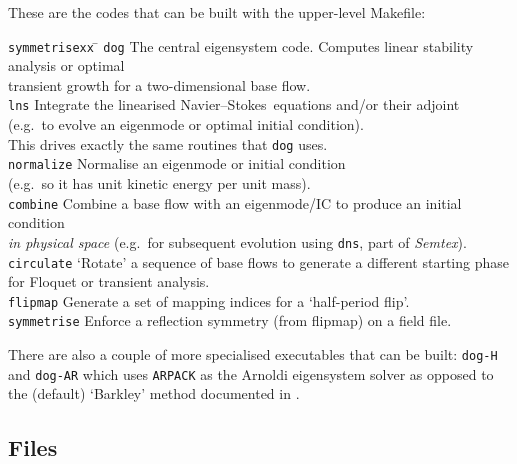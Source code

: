 \documentclass[11pt,a4paper]{report}
\newcommand\NavSto{Navier--Stokes}
\newcommand{\eg}{e.g.\ }
\newcommand{\Semtex}{\emph{Semtex}}
\begin{document}
These are the codes that can be built with the upper-level Makefile:
\begin{tabbing}
\texttt{symmetrisexx} \= \kill
% 
\texttt{dog} 
\> The central eigensystem code. Computes linear stability analysis or 
optimal \\
\> transient growth for a two-dimensional base flow.\\
%
\texttt{lns} 
\> Integrate the linearised \NavSto\ equations and/or their adjoint\\ 
\> (\eg to evolve an eigenmode or optimal initial condition).\\ 
\> This drives exactly the same routines that \texttt{dog} uses.\\
%
\texttt{normalize} 
\> Normalise an eigenmode or initial condition \\
\> (\eg so it has unit kinetic energy per unit mass).\\
%
\texttt{combine} 
\> Combine a base flow with an eigenmode/IC to
produce an initial condition \\ \> \emph{in physical space} (\eg for
subsequent evolution using \texttt{dns}, part of \Semtex).\\
%
\texttt{circulate} 
\> `Rotate' a sequence of base flows to generate a different starting phase\\ 
\> for Floquet or transient analysis.\\
%
\texttt{flipmap} 
\> Generate a set of mapping indices for a `half-period flip'.\\
%
\texttt{symmetrise} 
\> Enforce a reflection symmetry (from flipmap) on a field file.
\end{tabbing}

There are also a couple of more specialised executables that can be
built: \texttt{dog-H} \citep[for computing stability with a
  half-period flip, see e.g.][]{bml05} and \texttt{dog-AR} which uses
\texttt{ARPACK} \citep{lehoucq98} as the Arnoldi eigensystem solver as
opposed to the (default) `Barkley' method documented in
\citet{bbs08b}.

\subsection{Files}
\end{document}
